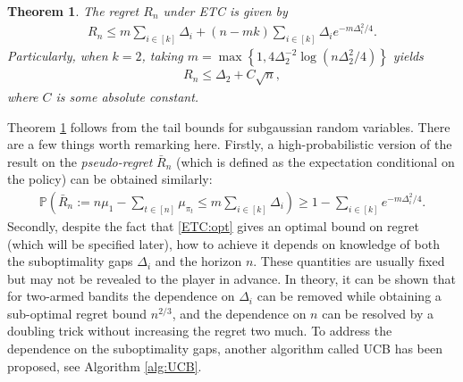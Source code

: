 \documentclass[10pt,a4paper]{amsart}
\numberwithin{equation}{section}
\theoremstyle{plain}
\newtheorem{Th}{Theorem}
\theoremstyle{definition}
\def\P{{\mathbb P}}
\begin{document}
\begin{Th}\label{thm:ETC}
The regret $R_n$ under ETC is given by
\begin{align}
R_n\leq m\sum_{i\in [k]}\Delta_i + (n-mk)\sum_{i\in [k]}\Delta_i e^{-m\Delta_i^2/4}.
\end{align}
Particularly, when $k=2$, taking $m=\max\left\{1, 4\Delta_2^{-2}\log(n\Delta_2^2/4)\right\}$ yields
\begin{align}
R_n\leq\Delta_2+C\sqrt{n},\label{ETC:opt}
\end{align}
where $C$ is some absolute constant. 
\end{Th}

Theorem \ref{thm:ETC} follows from the tail bounds for subgaussian random variables. There are a few things worth remarking here. Firstly, a high-probabilistic version of the result on the \emph{pseudo-regret} $\bar{R}_n$ (which is defined as the expectation conditional on the policy) can be obtained similarly:
\begin{align*}
\P\left(\bar{R}_n:=n\mu_1-\sum_{t\in [n]}\mu_{\pi_t}\leq m\sum_{i\in [k]}\Delta_i\right)\geq 1-\sum_{i\in [k]}e^{-m\Delta_i^2/4}. 
\end{align*} 
Secondly, despite the fact that \eqref{ETC:opt} gives an optimal bound on regret (which will be specified later), how to achieve it depends on knowledge of both the suboptimality gaps $\Delta_i$ and the horizon $n$. These quantities are usually fixed but may not be revealed to the player in advance. In theory, it can be shown that for two-armed bandits the dependence on $\Delta_i$ can be removed while obtaining a sub-optimal regret bound $n^{2/3}$, and the dependence on $n$ can be resolved by a doubling trick without increasing the regret two much. To address the dependence on the suboptimality gaps, another algorithm called UCB has been proposed, see Algorithm \ref{alg:UCB}. 
\end{document}
